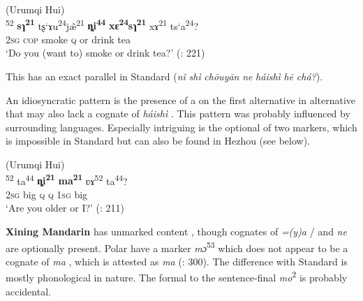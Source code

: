 \ea%
    \label{ex:trans:17}
     (Urumqi Hui)\\
    \textsuperscript{52}  \textbf{{sɿ}}\textbf{\textsuperscript{21}}  {tʂ‘ɤu}\textsuperscript{24}{j\~{æ}}\textsuperscript{21}  \textbf{{ȵi}}\textbf{\textsuperscript{44}} \textbf{{xɛ}}\textbf{\textsuperscript{24}}\textbf{{sɿ}}\textbf{\textsuperscript{21}}    {xɤ}\textsuperscript{21}  {ts‘a}\textsuperscript{24}?\\
    2\textsc{sg}  \textsc{cop}  smoke    \textsc{q}  or    drink  tea\\
    \glt ‘Do you (want to) smoke or drink tea?’ (\citealt{LiuLiji1989}: 221)
    \z

\noindent This has an exact parallel in Standard  (\textit{nǐ} \textit{shì} \textit{chōuyān} \textit{ne} \textit{háishì} \textit{h\=e} \textit{chá?}).

An idiosyncratic pattern is the presence of a  on the first alternative in alternative  that may also lack a cognate of  \textit{háishì} . This pattern was probably influenced by surrounding  languages. Especially intriguing is the optional  of two markers, which is impossible in Standard  but can also be found in Hezhou  (see  below).

\ea%
    \label{ex:trans:18}
     (Urumqi Hui)\\
    \textsuperscript{52}  {ta}\textsuperscript{44}  \textbf{{ȵi}}\textbf{\textsuperscript{21}}  \textbf{{ma}}\textbf{\textsuperscript{21}}  {ʋɤ}\textsuperscript{52}  {ta}\textsuperscript{44}?\\
    2\textsc{sg}  big  \textsc{q}  \textsc{q}  1\textsc{sg}  big\\
    \glt ‘Are you older or I?’ (\citealt{LiuLiji1989}: 211)
    \z

\textbf{Xining Mandarin} has unmarked content , though cognates of  \textit{=(y)a} / and \textit{ne}  are optionally present. Polar  have a marker \textit{mɔ}\textsuperscript{53} which does not appear to be a cognate of  \textit{ma} , which is attested as \textit{ma} (\citealt{ZhangChengzai1980}: 300). The difference with Standard  is mostly phonological in nature. The formal  to the  sentence-final  \textit{mo}\textsuperscript{2} is probably accidental.


